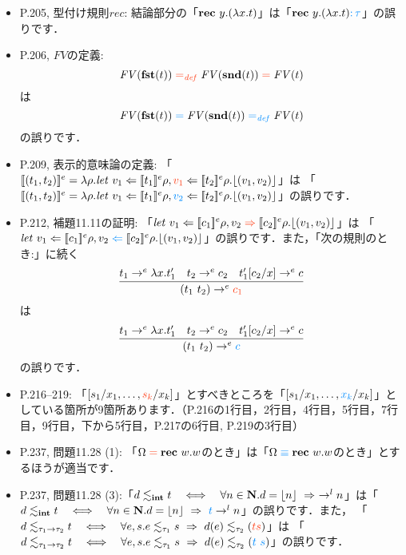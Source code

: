 \documentclass[12pt,titlepage,twoside,openright,dvipdfmx]{jsbook}
\newcommand\old[1]{%
  \textcolor[rgb]{1.0,0.25,0.1}{#1}%
  }
\newcommand\new[1]{%
  \textcolor[rgb]{0,0.55,1.0}{#1}%
  }
\theoremstyle{definition}
\begin{document}
\ifnum{}
\ifnum{}
\begin{itemize}
\item P.205, 型付け規則$\mathit{rec}$: 結論部分の「${\bf rec}\ {y.(\lambda x.t)}$」は「$\rec{y.(\lambda x.t)}\new{ \COL \tau}$」の誤りです．
\item P.206, $\mathit{FV}$の定義:
  \[
    \mathit{FV}(\fst(t)) \old{{}=_{\mathit{def}}{}} \mathit{FV}(\snd(t)) \old{{}={}} \mathit{FV}(t)
  \]
  は
  \[
    \mathit{FV}(\fst(t)) \new{{}={}} \mathit{FV}(\snd(t)) \new{{}=_{\mathit{def}}{}} \mathit{FV}(t)
  \]
  の誤りです．
\item P.209, 表示的意味論の定義:
  「$\eden{(t_1,t_2)} = \lambda\rho.{\it let}\ v_1\Leftarrow\eden{t_1}\rho, \old{v_1}\Leftarrow\eden{t_2}\rho.\floor{(v_1,v_2)}$」は
  「$\eden{(t_1,t_2)} = \lambda\rho.{\it let}\ v_1\Leftarrow\eden{t_1}\rho, \new{v_2}\Leftarrow\eden{t_2}\rho.\floor{(v_1,v_2)}$」の誤りです．
\item P.212, 補題11.11の証明:
  「$\mathit{let}\ v_1\Leftarrow\eden{c_1}\rho,v_2\old{{}\Rightarrow{}}\eden{c_2}\rho.\floor{(v_1,v_2)}$」は
  「$\mathit{let}\ v_1\Leftarrow\eden{c_1}\rho,v_2\new{{}\Leftarrow{}}\eden{c_2}\rho.\floor{(v_1,v_2)}$」の誤りです．また，「次の規則のとき:」に続く
   \[
     \infer{(t_1\ t_2)\to^e \old{c_1}}{
       t_1\to^e\lambda x.t'_1
       & t_2\to^e c_2
       & t'_1[c_2/x] \to^e c}
   \]
   は
   \[
     \infer{(t_1\ t_2)\to^e \new{c}}{
       t_1\to^e\lambda x.t'_1
       & t_2\to^e c_2
       & t'_1[c_2/x] \to^e c}
   \]
   の誤りです．
 \item P.216--219:
   「$[s_1/x_1,\ldots,\old{s_k}/x_k]$」とすべきところを「$[s_1/x_1,\ldots,\new{x_k}/x_k]$」としている箇所が9箇所あります．（P.216の1行目，2行目，4行目，5行目，7行目，9行目，下から5行目，P.217の6行目, P.219の3行目）
 \item P.237, 問題11.28 (1): 「$\Omega\old{{}={}}\rec{w.w}$のとき」は「$\Omega \new{{}\equiv{}} \rec{w.w}$のとき」とするほうが適当です．
 \item P.237, 問題11.28
   (3):「$d\lesssim_{\bf int} t \quad \Longleftrightarrow\quad \forall
   n\in{\bf N}.d=\lfloor{n}\rfloor \ \Rightarrow\ \to^l
   n$」は「$d\lesim_\typint t \quad \Longleftrightarrow\quad \forall
   n\in\Natu.d=\floor{n} \ \Rightarrow\ \new{t} \to^l n$」の誤りです．また，
   「$d\lesim_{\tau_1\typfun\tau_2}t \quad \Longleftrightarrow\quad
   \forall e,s.e\lesim_{\tau_1}s\ \Rightarrow\ d(e)\lesim_{\tau_2}(\old{t s})$」は
   「$d\lesim_{\tau_1\typfun\tau_2}t \quad \Longleftrightarrow\quad 
   \forall e,s.e\lesim_{\tau_1}s\ \Rightarrow\ d(e)\lesim_{\tau_2}(\new{t\ s})$」の誤りです．
\end{itemize}
\fi
\fi
\end{document}
